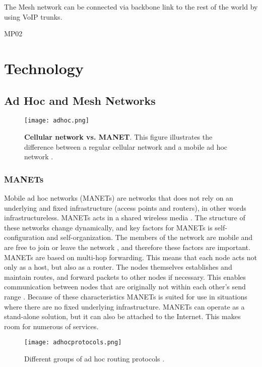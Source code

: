 The Mesh network can be connected via backbone link to the rest of the world by using VoIP trunks. 


MP02





\section{Technology}

\subsection{Ad Hoc and Mesh Networks}

\begin{figure}[h!]
  \centering
    \texttt{[image: adhoc.png]}
     \caption [Cellular network vs. MANET]{\textbf{Cellular network vs. MANET}. This figure illustrates the difference between a regular cellular network and a mobile ad hoc network \cite{adhoc2}.}
\label{fig:adhoc}
\end{figure}

\subsubsection{MANETs} Mobile ad hoc networks (MANETs) are networks that does not rely on an underlying and fixed infrastructure (access points and routers), in other words infrastructureless. MANETs acts in a shared wireless media \cite{adhoc}. The structure of these networks change dynamically, and key factors for MANETs is self-configuration and self-organization. The members of the network are mobile and are free to join or leave the network \cite{adhoc2}, and therefore these factors are important. MANETs are based on multi-hop forwarding. This means that each node acts not only as a host, but also as a router. The nodes themselves establishes and maintain routes, and forward packets to other nodes if necessary. This enables communication between nodes that are originally not within each other's send range \cite{adhoc2}. Because of these characteristics MANETs is suited for use in situations where there are no fixed underlying infrastructure. MANETs can operate as a stand-alone solution, but it can also be attached to the Internet. This makes room for numerous of services. 

\begin{figure}[h!]
  \centering
    \texttt{[image: adhocprotocols.png]}
     \caption{Different groups of ad hoc routing protocols \cite{adhoc}.}
\label{fig:adhocprotocols}
\end{figure}


